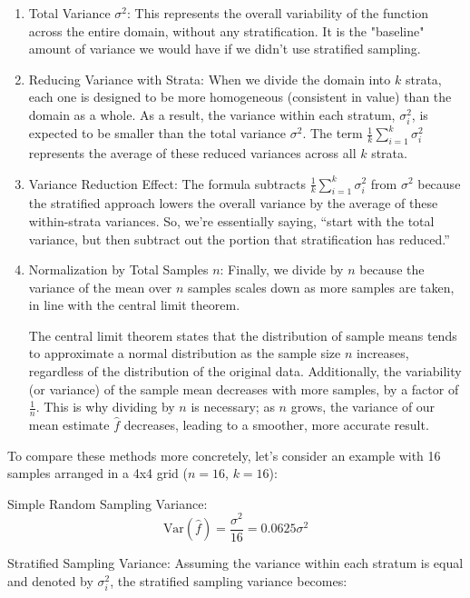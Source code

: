 \documentclass[12pt]{article}
\begin{document}
\begin{enumerate}
    \item Total Variance $\sigma^2$: This represents the overall variability of the function across the entire domain, without any stratification. It is the "baseline" amount of variance we would have if we didn’t use stratified sampling.

    \item Reducing Variance with Strata: When we divide the domain into $k$ strata, each one is designed to be more homogeneous (consistent in value) than the domain as a whole. As a result, the variance within each stratum, $\sigma_i^2$, is expected to be smaller than the total variance $\sigma^2$. The term $\frac{1}{k} \sum_{i=1}^k \sigma_i^2$ represents the average of these reduced variances across all $k$ strata.

    \item Variance Reduction Effect: The formula subtracts $\frac{1}{k} \sum_{i=1}^k \sigma_i^2$ from $\sigma^2$ because the stratified approach lowers the overall variance by the average of these within-strata variances. So, we’re essentially saying, “start with the total variance, but then subtract out the portion that stratification has reduced.”

    \item Normalization by Total Samples $n$: Finally, we divide by $n$ because the variance of the mean over $n$ samples scales down as more samples are taken, in line with the central limit theorem.

          The central limit theorem states that the distribution of sample means tends to approximate a normal distribution as the sample size $n$ increases, regardless of the distribution of the original data. Additionally, the variability (or variance) of the sample mean decreases with more samples, by a factor of $\frac{1}{n}$. This is why dividing by $n$ is necessary; as $n$ grows, the variance of our mean estimate $\hat{f}$ decreases, leading to a smoother, more accurate result.

\end{enumerate}

To compare these methods more concretely, let's consider an example with 16 samples arranged in a 4x4 grid ($n = 16$, $k = 16$):

Simple Random Sampling Variance:
\[
    \text{Var}(\hat{f}) = \frac{\sigma^2}{16} = 0.0625\sigma^2
\]

Stratified Sampling Variance: Assuming the variance within each stratum is equal and denoted by $\sigma^2_i$, the stratified sampling variance becomes:
\end{document}
